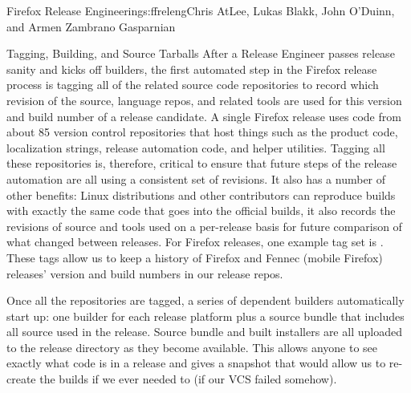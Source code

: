 \begin{aosachapter}{Firefox Release Engineering}{s:ffreleng}{Chris AtLee, Lukas Blakk, John O'Duinn, and Armen Zambrano Gasparnian}
\begin{aosasect1}{Tagging, Building, and Source Tarballs}
After a Release Engineer passes release sanity and kicks off builders,
the first automated step in the Firefox release process is tagging all
of the related source code repositories to record which revision of
the source, language repos, and related tools are used for this
version and build number of a release candidate. A single Firefox
release uses code from about 85 version control repositories that host
things such as the product code, localization strings, release
automation code, and helper utilities. Tagging all these repositories
is, therefore, critical to ensure that future steps of the release
automation are all using a consistent set of revisions. It also has a
number of other benefits: Linux distributions and other contributors
can reproduce builds with exactly the same code that goes into the
official builds, it also records the revisions of source and tools
used on a per-release basis for future comparison of what changed
between releases. For Firefox releases, one example tag set is
.  These tags allow us
to keep a history of Firefox and Fennec (mobile Firefox) releases'
version and build numbers in our release repos.
    
Once all the repositories are tagged, a series of dependent builders
automatically start up: one builder for each release platform plus a
source bundle that includes all source used in the release.  Source
bundle and built installers are all uploaded to the release directory
as they become available.  This allows anyone to see exactly what code
is in a release and gives a snapshot that would allow us to re-create
the builds if we ever needed to (if our VCS failed somehow).
    

\end{aosasect1}
\end{aosachapter}
